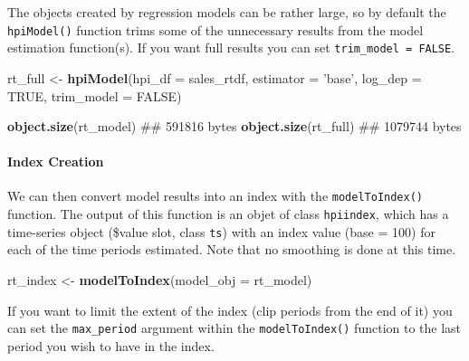 \documentclass[]{article}
\newenvironment{Shaded}{\begin{snugshade}}{\end{snugshade}}
\newcommand{\DataTypeTok}[1]{\textcolor[rgb]{0.13,0.29,0.53}{#1}}
\newcommand{\DecValTok}[1]{\textcolor[rgb]{0.00,0.00,0.81}{#1}}
\newcommand{\KeywordTok}[1]{\textcolor[rgb]{0.13,0.29,0.53}{\textbf{#1}}}
\newcommand{\NormalTok}[1]{#1}
\newcommand{\OperatorTok}[1]{\textcolor[rgb]{0.81,0.36,0.00}{\textbf{#1}}}
\newcommand{\OtherTok}[1]{\textcolor[rgb]{0.56,0.35,0.01}{#1}}
\newcommand{\StringTok}[1]{\textcolor[rgb]{0.31,0.60,0.02}{#1}}
\let\oldparagraph\paragraph
\renewcommand{\paragraph}[1]{\oldparagraph{#1}\mbox{}}
\begin{document}
The objects created by regression models can be rather large, so by
default the \texttt{hpiModel()} function trims some of the unnecessary
results from the model estimation function(s). If you want full results
you can set \texttt{trim\_model\ =\ FALSE}.

\begin{Shaded}
\begin{Highlighting}[]
\NormalTok{  rt_full <-}\StringTok{ }\KeywordTok{hpiModel}\NormalTok{(}\DataTypeTok{hpi_df =}\NormalTok{ sales_rtdf,}
                      \DataTypeTok{estimator =} \StringTok{'base'}\NormalTok{,}
                      \DataTypeTok{log_dep =} \OtherTok{TRUE}\NormalTok{,}
                      \DataTypeTok{trim_model =} \OtherTok{FALSE}\NormalTok{)}

  \KeywordTok{object.size}\NormalTok{(rt_model)}
\NormalTok{## 591816 bytes}
  \KeywordTok{object.size}\NormalTok{(rt_full)}
\NormalTok{## 1079744 bytes}
\end{Highlighting}
\end{Shaded}

\hypertarget{index-creation}{%
\paragraph{Index Creation}\label{index-creation}}

We can then convert model results into an index with the
\texttt{modelToIndex()} function. The output of this function is an
objet of class \texttt{hpiindex}, which has a time-series object
(\$value slot, class \texttt{ts}) with an index value (base = 100) for
each of the time periods estimated. Note that no smoothing is done at
this time.

\begin{Shaded}
\begin{Highlighting}[]
\NormalTok{  rt_index <-}\StringTok{ }\KeywordTok{modelToIndex}\NormalTok{(}\DataTypeTok{model_obj =}\NormalTok{ rt_model)}
\end{Highlighting}
\end{Shaded}

If you want to limit the extent of the index (clip periods from the end
of it) you can set the \texttt{max\_period} argument within the
\texttt{modelToIndex()} function to the last period you wish to have in
the index.

\begin{Shaded}
\end{Shaded}
\end{document}
